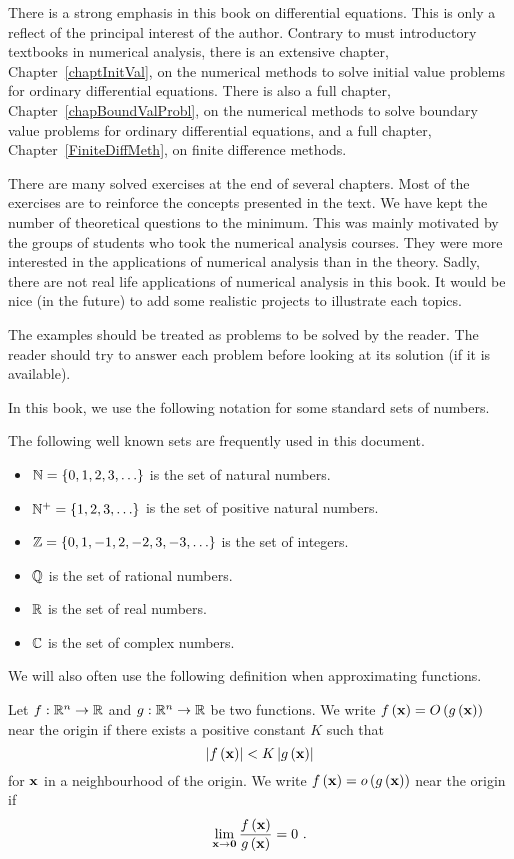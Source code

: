 There is a strong emphasis in this book on differential equations.
This is only a reflect of the principal interest of the author.
Contrary to must introductory textbooks in numerical analysis, 
there is an extensive chapter, Chapter~\ref{chaptInitVal}, on the
numerical methods to solve initial value problems for ordinary
differential equations.  There is also a full chapter,
Chapter~\ref{chapBoundValProbl}, on the numerical methods to solve
boundary value problems for ordinary differential equations, and 
a full chapter, Chapter~\ref{FiniteDiffMeth}, on finite difference
methods.

There are many solved exercises at the end of several chapters.  Most
of the exercises are to reinforce the concepts presented in the text.
We have kept the number of theoretical questions to the minimum.
This was mainly motivated by the groups of students who took the
numerical analysis courses.  They were more interested in the
applications of numerical analysis than in the theory.  Sadly, there
are not real life applications of numerical analysis in this book.  It
would be nice (in the future) to add some realistic projects to
illustrate each topics.

The examples should be treated as problems to be solved by the reader.
The reader should try to answer each problem before looking at its
solution (if it is available).

In this book, we use the following notation for some standard
sets of numbers.

\begin{defn*}
The following well known sets are frequently used in this document.
\begin{itemize}
\item $\mathbb{N} = \{0,1,2,3,\ldots \}$ is the set of natural numbers.
\item $\mathbb{N}^+ = \{1,2,3,\ldots \}$ is the set of positive natural numbers.
\item $\mathbb{Z} = \{0,1,-1,2,-2,3,-3, \ldots \}$ is the set of integers.
\item $\mathbb{Q}$ is the set of rational numbers.
\item $\mathbb{R}$ is the set of real numbers.
\item $\mathbb{C}$ is the set of complex numbers.
\end{itemize}
\end{defn*}

We will also often use the following definition when approximating
functions.

\begin{defn*} Let $f:\mathbb{R}^n \rightarrow \mathbb{R}$ and
$g:\mathbb{R}^n \rightarrow \mathbb{R}$ be two functions.  We write
$f\left(\mathbf{x}\right) = O\left(g\left(\mathbf{x}\right)\right)$ near
the origin if there exists a positive constant $K$ such that
\[
\left| f\left(\mathbf{x}\right) \right| < K \left| g\left(\mathbf{x}\right) \right|
\]
for $\mathbf{x}$ in a neighbourhood of the origin.  We write
$f\left(\mathbf{x}\right) = o\left(g\left(\mathbf{x}\right)\right)$ near
the origin if
\[
\lim_{\mathbf{x}\rightarrow \mathbf{0}} \frac{f\left(\mathbf{x}\right)}
{g\left(\mathbf{x}\right)} = 0 \ .
\]
\end{defn*}

